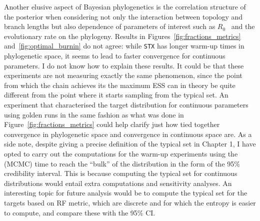 Another elusive aspect of Bayesian phylogenetics is the correlation structure of the posterior when considering not only the interaction between topology and branch lengths but also dependence of parameters of interest such as $R_0$~\citep{Stadler2011} and the evolutionary rate on the phylogeny.
Results in Figures~\ref{fig:fractions_metrics} and~\ref{fig:optimal_burnin} do not agree: while \verb|STX| has longer warm-up times in phylogenetic space, it seems to lead to faster convergence for continuous parameters.
I do not know how to explain these results.
It could be that these experiments are not measuring exactly the same phenomenon, since the point from which the chain achieves its the maximum ESS can in theory be quite different from the point where it starts sampling from the typical set.
An experiment that characterised the target distribution for continuous parameters using golden runs in the same fashion as what was done in Figure~\ref{fig:fractions_metrics} could help clarify just how tied together convergence in phylogenetic space and convergence in continuous space are.
As a side note, despite giving a precise definition of the typical set in Chapter 1, I have opted to carry out the computations for the warm-up experiments using the (MCMC) time to reach the ``bulk'' of the distribution in the form of the 95\% credibility interval.
This is because computing the typical set for continuous distributions would entail extra computations and sensitivity analyses.
An interesting topic for future analysis would be to compute the typical set for the targets based on RF metric, which are discrete and for which the entropy is easier to compute, and compare these with the 95\% CI.

